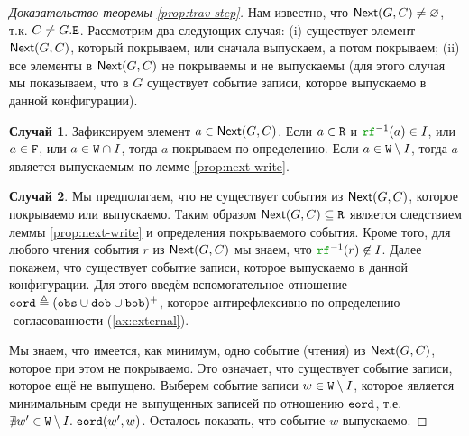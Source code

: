 \begin{proof}[Доказательство теоремы \ref{prop:trav-step}]
  Нам известно, что ${\sf Next}(G, C) \neq \varnothing$, т.к. $C \neq G.{\mathtt{E}}$.
  Рассмотрим два следующих случая: (i) существует
  элемент ${\sf Next}(G, C)$, который покрываем, или сначала выпускаем, а потом покрываем; (ii) 
  все элементы в ${\sf Next}(G, C)$ не покрываемы и не выпускаемы
  (для этого случая мы показываем, что в $G$ существует событие записи, которое выпускаемо в данной конфигурации).

  {\bf Случай 1}.
  Зафиксируем элемент $a \in {\sf Next}(G, C)$.
  Если $a \in {\mathtt{R}}$ и $\lRF^{-1}(a) \in \IssuedSet$, или $a \in {\mathtt{F}}$, или $a \in {\mathtt{W}} \cap I$,
  тогда $a$ покрываем по определению.
  Если $a \in {\mathtt{W}} \setminus I$, тогда $a$ является выпускаемым по лемме \ref{prop:next-write}.

  {\bf Случай 2}.
  Мы предполагаем, что не существует события из ${\sf Next}(G, C)$, которое покрываемо или выпускаемо.
  Таким образом ${\sf Next}(G, C) \subseteq {\mathtt{R}}$ является следствием леммы \ref{prop:next-write} и определения покрываемого события.
  Кроме того, для любого чтения события $r$ из ${\sf Next}(G, C)$ мы знаем, что $\lRF^{-1}(r) \nin \IssuedSet$.
  Далее покажем, что существует событие записи, которое выпускаемо в данной конфигурации.
  Для этого введём вспомогательное отношение ${\mathtt{eord}} \triangleq ({\mathtt{obs}} \cup {\mathtt{dob}} \cup {\mathtt{bob}})^{+}$,
  которое антирефлексивно по определению \ARM-согласованности (\ref{ax:external}).
  
  Мы знаем, что имеется, как минимум, одно событие (чтения) из ${\sf Next}(G, C)$, которое при этом не покрываемо.
  Это означает, что существует событие записи, которое ещё не выпущено.
  Выберем событие записи $w \in {\mathtt{W}} \setminus I$, которое является минимальным среди не выпущенных записей по отношению ${\mathtt{eord}}$,
т.е. $\nexists w' \in {\mathtt{W}} \setminus I. \; {\mathtt{eord}}(w', w)$.
  Осталось показать, что событие $w$ выпускаемо.
  

\end{proof}
